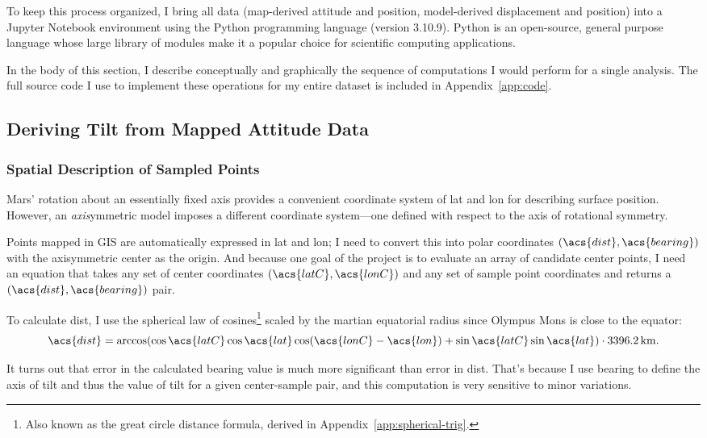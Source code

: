 To keep this process organized, I bring all data (map-derived attitude and position, model-derived displacement and position) into a Jupyter Notebook environment using the Python programming language (version 3.10.9). Python is an open-source, general purpose language whose large library of modules make it a popular choice for scientific computing applications.

In the body of this section, I describe conceptually and graphically the sequence of computations I would perform for a single analysis. The full source code I use to implement these operations for my entire dataset is included in Appendix~\ref{app:code}.

\subsection{Deriving Tilt from Mapped Attitude Data}\label{sec:tilt-from-map}

\subsubsection{Spatial Description of Sampled Points}

Mars' rotation about an essentially fixed axis provides a convenient coordinate system of \ac{lat} and \ac{lon} for describing surface position. However, an \emph{axis}ymmetric model imposes a different coordinate system---one defined with respect to the axis of rotational symmetry.

Points mapped in GIS are automatically expressed in \ac{lat} and \ac{lon}; I need to convert this into polar coordinates $(\acs{dist},\acs{bearing})$ with the axisymmetric center as the origin. And because one goal of the project is to evaluate an array of candidate center points, I need an equation that takes any set of center coordinates $(\acs{latC}, \acs{lonC})$ and any set of sample point coordinates and returns a $(\acs{dist},\acs{bearing})$ pair.

To calculate \acf{dist}, I use the spherical law of cosines\footnote{Also known as the great circle distance formula, derived in Appendix~\ref{app:spherical-trig}.} scaled by the martian equatorial radius since Olympus Mons is close to the equator:
\begin{equation}
    \acs{dist}=\arccos(\cos\acs{latC}\cos\acs{lat}\cos(\acs{lonC}-\acs{lon}) + \sin\acs{latC}\sin\acs{lat})\cdot\qty{3396.2}{\km}.
\end{equation}

It turns out that error in the calculated \acs{bearing} value is much more significant than error in \acs{dist}. That's because I use \acs{bearing} to define the axis of tilt and thus the value of tilt for a given center-sample pair, and this computation is very sensitive to minor variations.


